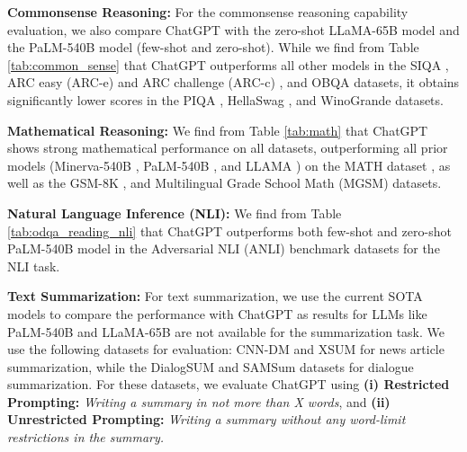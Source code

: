 \documentclass[11pt]{article}
\begin{document}
     \textbf{Commonsense Reasoning:} For the commonsense reasoning capability evaluation, we also compare ChatGPT with the zero-shot LLaMA-65B model and the PaLM-540B model (few-shot and zero-shot). While we find from Table \ref{tab:common_sense} that ChatGPT outperforms all other models in the SIQA \cite{sap2019siqa}, ARC easy (ARC-e) and ARC challenge (ARC-c) \cite{clark2018thinkarc}, and OBQA \cite{mihaylov2018obqa} datasets, it obtains significantly lower scores in the PIQA \cite{bisk2020piqa}, HellaSwag \cite{zellers2019hellaswag}, and WinoGrande \cite{sakaguchi2020winogrande} datasets. 

    \textbf{Mathematical Reasoning:} We find from Table \ref{tab:math} that ChatGPT shows strong mathematical performance on all datasets, outperforming all prior models (Minerva-540B \cite{lewkowyczsolvingminerva}, PaLM-540B \cite{chowdhery2022palm}, and LLAMA \cite{touvron2023llama}) on the MATH dataset \cite{hendrycksmath2021}, as well as the GSM-8K  \cite{cobbe2021traininggsm8k}, and Multilingual Grade School Math (MGSM) \cite{shi2022languagemgsm} datasets. 

     \textbf{Natural Language Inference (NLI):} We find from Table \ref{tab:odqa_reading_nli} that ChatGPT outperforms both few-shot and zero-shot PaLM-540B model \cite{chowdhery2022palm} in the Adversarial NLI (ANLI) \cite{nie-etal-2020-adversarial} benchmark datasets for the NLI task. 

       
    \textbf{Text Summarization:} For text summarization, we use the current SOTA models to compare the performance with ChatGPT as results for LLMs like PaLM-540B and LLaMA-65B are not available for the summarization task. We use the following datasets for evaluation: CNN-DM \cite{see-etal-2017-get,hermann2015teaching} and XSUM \cite{narayan2018donxsum} for news article summarization, while the  DialogSUM \cite{chen2021dialogsum} and SAMSum \cite{gliwa2019samsum} datasets for dialogue summarization. For these datasets, we evaluate ChatGPT using \textbf{(i) Restricted Prompting:} \textit{Writing a summary in not more than X words}, and  \textbf{(ii) Unrestricted Prompting:} \textit{Writing a summary without any word-limit restrictions in the summary.}
\end{document}
